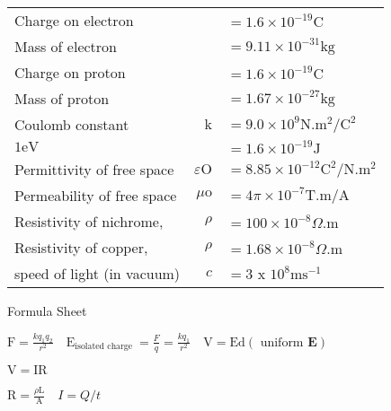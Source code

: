 \documentclass{extarticle}
\begin{document}
\begin{tabularx}{\textwidth}{Xr@{}l}

Charge on electron & & $=1.6 \times 10^{-19} \mathrm{C} \quad$ \\

Mass of electron & & $=9.11 \times 10^{-31} \mathrm{kg}$ \\

Charge on proton & & $=1.6 \times 10^{-19} \mathrm{C} \quad$ \\

Mass of proton & & $=1.67 \times 10^{-27} \mathrm{kg}$ \\

Coulomb constant & $\mathrm{k}$ & $=9.0 \times 10^{9} \mathrm{N} . \mathrm{m}^{2} / \mathrm{C}^{2}$ \\

$1 \mathrm{eV}$ & & $=1.6 \times 10^{-19} \mathrm{J}$ \\

Permittivity of free space & $\varepsilon \mathrm{O}$ & $=8.85 \times 10^{-12} \mathrm{C}^{2} / \mathrm{N} . \mathrm{m}^{2}$ \\

Permeability of free space & $\mu \mathrm{o}$ & $=4 \pi \times 10^{-7} \mathrm{T} . \mathrm{m} / \mathrm{A}$ \\

Resistivity of nichrome, & $\rho$ & $=100 \times 10^{-8} \Omega . \mathrm{m}$ \\

Resistivity of copper, & $\rho$ & $=1.68 \times 10^{-8} \Omega . \mathrm{m}$ \\

speed of light (in vacuum) & $c$ & $=3$ x $10^{8} \mathrm{ms}^{-1}$ \\

\end{tabularx}

\markEnd

\markStart[100]


Formula Sheet

$\mathrm{F}=\frac{k q_{1} q_{2}}{r^{2}} \quad \mathrm{E}_{\text {isolated charge }}=\frac{F}{q}=\frac{k q_{1}}{r^{2}} \quad \mathrm{V}=\mathrm{Ed}(\text { uniform } \mathbf{E})$

$\mathrm{V}=\mathrm{IR}$

$\mathrm{R}=\frac{\rho \mathrm{L}}{\mathrm{A}} \quad I=Q / t$
\end{document}
